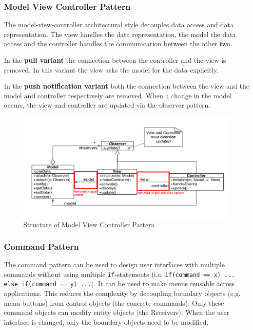 \subsubsection{Model View Controller Pattern}
The model-view-controller architectural style decouples data access and data representation.
The view handles the data representation, the model the data access and the controller handles the communication between the other two.\newline

In the \textbf{pull variant} the connection between the controller and the view is removed.
In this variant the view asks the model for the data explicitly.

In the \textbf{push notification variant} both the connection between the view and the model and controller respectively are removed.
When a change in the model occurs, the view and controller are updated via the observer pattern.

\begin{figure}[h]
	\centering
	\includegraphics[width=\linewidth]{images/pattern_mvc.png}
	\caption{Structure of Model View Controller Pattern}
\end{figure}

\newpage

\subsubsection{Command Pattern}
The command pattern can be used to design user interfaces with multiple commands without using multiple \texttt{if}-statements (i.e. \texttt{if(command == x) {...} else if(command == y) ...}).
It can be used to make menus reusable across applications.
This reduces the complexity by decoupling boundary objects (e.g. menu buttons) from control objects (the concrete commands). Only these command objects can modify entity objects (the
Receivers).
When the user interface is changed, only the boundary objects need to be modified.\newline

